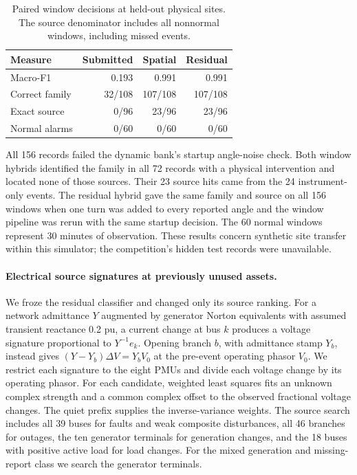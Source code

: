 \begin{table}[!ht]
\centering\small
\caption{Paired window decisions at held-out physical sites. The source
denominator includes all nonnormal windows, including missed events.}
\label{tab:window-held-locations}
\begin{tabular}{lrrr}\toprule
Measure & Submitted & Spatial & Residual\\\midrule
Macro-F1 & 0.193 & 0.991 & 0.991\\
Correct family & 32/108 & 107/108 & 107/108\\
Exact source & 0/96 & 23/96 & 23/96\\
Normal alarms & 0/60 & 0/60 & 0/60\\\bottomrule
\end{tabular}
\end{table}

All 156 records failed the dynamic bank's startup angle-noise check.
Both window hybrids identified the family in all 72 records with a
physical intervention and located none of those sources. Their 23
source hits came from the 24 instrument-only events. The residual
hybrid gave the same family and source on all 156 windows when one
turn was added to every reported angle and the window pipeline was
rerun with the same startup decision. The 60 normal windows represent
30 minutes of observation. These results concern synthetic site
transfer within this simulator; the competition's hidden test records
were unavailable.

\paragraph{Electrical source signatures at previously unused assets.}
We froze the residual classifier and changed only its source ranking.
For a network admittance $Y$ augmented by generator Norton equivalents
with assumed transient reactance 0.2 pu, a current change at bus $k$
produces a voltage signature proportional to $Y^{-1}e_k$.
Opening branch $b$, with admittance stamp $Y_b$, instead gives
$(Y-Y_b)\Delta V=Y_b V_0$ at the pre-event operating phasor $V_0$.
We restrict each signature to the eight PMUs and divide each voltage
change by its operating phasor. For each candidate, weighted least
squares fits an unknown complex strength and a common complex offset
to the observed fractional voltage changes. The quiet prefix supplies
the inverse-variance weights. The source search includes all 39 buses
for faults and weak composite disturbances, all 46 branches for
outages, the ten generator terminals for generation changes, and the
18 buses with positive active load for load changes. For the mixed
generation and missing-report class we search the generator terminals.


